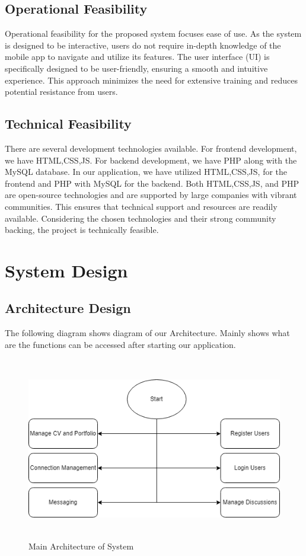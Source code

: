 \subsection{Operational Feasibility}
Operational feasibility for the proposed system focuses ease of use. As the system is designed to be interactive, users do not require in-depth knowledge of the mobile app to navigate and utilize its features. The user interface (UI) is specifically designed to be user-friendly, ensuring a smooth and intuitive experience. This approach minimizes the need for extensive training and reduces potential resistance from users.  
\subsection{Technical Feasibility}
There are several development technologies available. For frontend development, we have HTML,CSS,JS. For backend development, we have PHP along with the MySQL database. In our application, we have utilized HTML,CSS,JS, for the frontend and PHP with MySQL for the backend. Both HTML,CSS,JS, and PHP are open-source technologies and are supported by large companies with vibrant communities. This ensures that technical support and resources are readily available. Considering the chosen technologies and their strong community backing, the project is technically feasible.
\newpage
\section{System Design}
\subsection{Architecture Design}
The following diagram shows diagram of our Architecture. Mainly shows what are the functions can be accessed after starting our application.
\begin{figure}[H]
    \includegraphics[height = 8cm]{Diagrams/Main_Block.png}
    \caption{Main Architecture of System}
\end{figure}
\newpage
